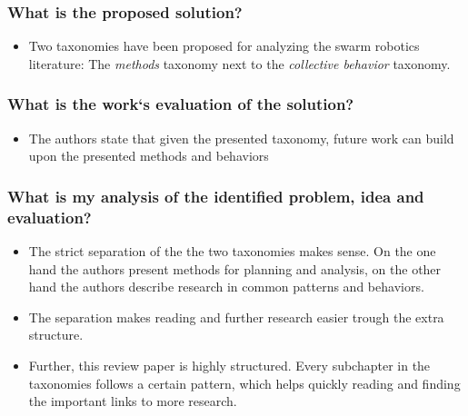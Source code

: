     \subsubsection*{What is the proposed solution?}
    \begin{itemize}
        \item Two taxonomies have been proposed for analyzing the swarm robotics literature: The \emph{methods} taxonomy next to the \emph{collective behavior} taxonomy.
    \end{itemize}
    \subsubsection*{What is the work`s evaluation of the solution?}
    \begin{itemize}
        \item The authors state that given the presented taxonomy, future work can build upon the presented methods and behaviors
    \end{itemize}
    \subsubsection*{What is my analysis of the identified problem, idea and evaluation?}
    \begin{itemize}
        \item The strict separation of the the two taxonomies makes sense. On the one hand the authors present methods for planning and analysis, on the other hand the authors describe research in common patterns and behaviors.
        \item The separation makes reading and further research easier trough the extra structure.
        \item Further, this review paper is highly structured. Every subchapter in the taxonomies follows a certain pattern, which helps quickly reading and finding the important links to more research. 
    \end{itemize}

